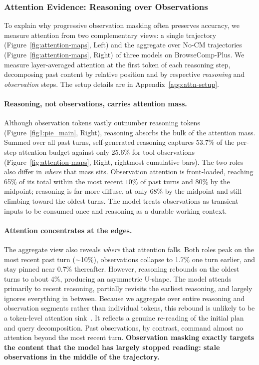 \subsubsection{Attention Evidence: Reasoning over Observations}
\label{exp:attention_dynamics}

To explain why progressive observation masking often preserves accuracy, we measure attention from two complementary views: a single trajectory (Figure~\ref{fig:attention-maps}, Left) and the aggregate over No-CM trajectories (Figure~\ref{fig:attention-maps}, Right) of three models on
BrowseComp-Plus. We measure
layer-averaged attention at the first token of each reasoning step,
decomposing past content by relative position and by respective \textit{reasoning} and \textit{observation} steps. The setup details are in
Appendix~\ref{app:attn-setup}.



\paragraph{Reasoning, not observations, carries attention mass.}

Although observation tokens vastly outnumber reasoning tokens (Figure~\ref{fig1:pie_main}, Right), reasoning absorbs the bulk of the attention mass. Summed over all past turns, self-generated reasoning captures 53.7\% of the per-step attention budget against only 25.6\% for tool observations (Figure~\ref{fig:attention-maps}, Right, rightmost cumulative
bars).
The two roles also differ in \emph{where} that mass sits. Observation attention is front-loaded, reaching 65\% of its total within the most recent $10\%$ of past turns and 80\% by the midpoint; reasoning is far more diffuse, at only 68\% by the midpoint and still climbing toward the oldest turns.
The model treats observations as transient inputs to be consumed once and reasoning as a durable working context.

\paragraph{Attention concentrates at the edges.} 
The aggregate view also reveals \emph{where} that attention falls. Both roles peak on the most recent past turn ($\sim$10\%), observations collapse to 1.7\% one turn earlier, and stay pinned near 0.7\% thereafter. However, reasoning rebounds on the oldest turns to about 4\%, producing an asymmetric U-shape. The model attends primarily to recent reasoning, partially revisits the earliest reasoning, and largely ignores everything in between. Because we aggregate over entire reasoning and observation segments rather than individual tokens, this rebound is unlikely to be a token-level attention
sink~\citep{xiao2024streamingllm}. It reflects a genuine re-reading of the initial plan and query decomposition. Past observations, by contrast, command almost no attention beyond the most recent turn. \textbf{Observation masking exactly targets the content that the model has largely stopped reading: stale observations in the middle of the trajectory.}


